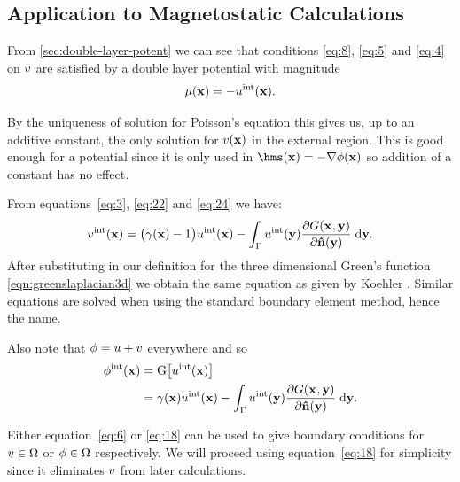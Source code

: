 \subsection{Application to Magnetostatic Calculations}
\label{sec:appl-magn-calc}

From \autoref{sec:double-layer-potent} we can see that conditions \eqref{eq:8}, \eqref{eq:5} and \eqref{eq:4} on $v$ are satisfied by a double layer potential with magnitude
\begin{equation}
  \label{eq:24}
  \mu(\mathbf{x}) = - u^{\text{int}}(\mathbf{x}).
\end{equation}

By the uniqueness of solution for Poisson's equation this gives us, up to an additive constant, the only solution for $v(\mathbf{x})$ in the external region.
This is good enough for a potential since it is only used in $\hms(\xv) = - \nabla \phim(\xv)$ so addition of a constant has no effect.

From equations~\eqref{eq:3}, \eqref{eq:22} and \eqref{eq:24} we have:
\begin{equation}
  \label{eq:6}
  v^{\text{int}}(\mathbf{x}) =  \big(\gamma(\mathbf{x}) - 1 \big) u^{\text{int}}(\mathbf{x})
  - \int_{{\Gamma}} u^{\text{int}}(\mathbf{y}) \frac{\partial G(\mathbf{x}_{},\mathbf{y})}{\partial \mathbf{\hat{n}}(\mathbf{y})} {\; \text{d}} \mathbf{y}.
\end{equation}
After substituting in our definition for the three dimensional Green's function \eqref{eqn:greenslaplacian3d} we obtain the same equation as given by Koehler \cite{Koehler1997}.
Similar equations are solved when using the standard boundary element method, hence the name.

Also note that $\phi = u + v$ everywhere and so
\begin{align}
  \label{eq:18}
  \phi^{\text{int}}(\mathbf{x}) &= {\mathbf{\mathrm{G}}} \big[ u^{\text{int}}(\mathbf{x}) \big] \\
  &= \gamma(\mathbf{x}) u^{\text{int}}(\mathbf{x})
  - \int_{{\Gamma}} u^{\text{int}}(\mathbf{y}) \frac{\partial G(\mathbf{x}_{},\mathbf{y})}{\partial \mathbf{\hat{n}}(\mathbf{y})} {\; \text{d}} \mathbf{y}. \notag
\end{align}

Either equation~\eqref{eq:6} or \eqref{eq:18} can be used to give boundary conditions for $v \in \Omega$ or $\phi \in \Omega$ respectively. We will proceed using equation~\eqref{eq:18} for simplicity since it eliminates $v$ from later calculations.

